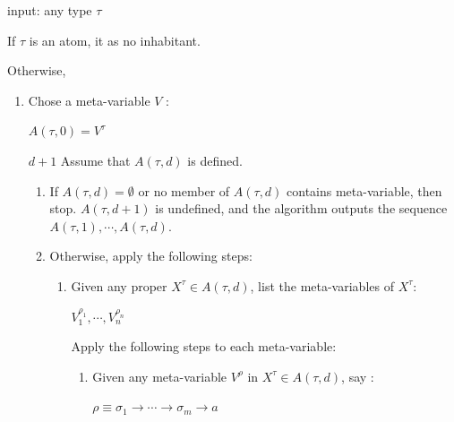 \documentclass[a4paper,10pt]{article}
\begin{document}
\begin{mydef}\label{8C6}

input: any type $\tau$

If $\tau$ is an atom, it as no inhabitant.

Otherwise,

\begin{enumerate}
      \item Chose a meta-variable $V$ :
        \begin{center}
              $A(\tau,0) = V^{\tau}$
        \end{center}

      \item[$d+1$] Assume that $A(\tau,d)$ is defined.
        
        \begin{enumerate}
              \item If $A(\tau,d) = \emptyset$ or no member of
                $A(\tau,d)$ contains meta-variable, then
                stop. $A(\tau,d+1)$ is undefined, and the algorithm
                outputs the sequence $A(\tau,1), \cdots, A(\tau,d)$.

                \item Otherwise, apply the following steps:

                \begin{enumerate}
                       \item Given any proper $X^{\tau} \in A(\tau,d)$, list
                       the meta-variables of $X^{\tau}$:

                       \begin{center}
                              $V^{\rho_1}_1, \cdots, V^{\rho_n}_n$
                         \end{center}
                         Apply the following steps to each
                         meta-variable:

                         \begin{enumerate}
                                \item Given any meta-variable
                                  $V^{\rho}$ in $X^{\tau} \in
                                  A(\tau,d)$, say :
                                 
                                 \begin{center}
                                       $\rho \equiv \sigma_1 \rightarrow
                                       \cdots \rightarrow \sigma_m
                                       \rightarrow a$
                                 \end{center}
                                 

\end{enumerate}
\end{enumerate}
\end{enumerate}
\end{enumerate}
\end{mydef}
\end{document}
